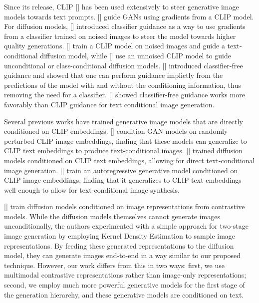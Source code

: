 Since its release, CLIP [] has been used extensively to steer generative image models towards text prompts. \citeauthor{clipglass,styleclip,bigsleep,stylegannada} [] guide GANs using gradients from a CLIP model. For diffusion models, \citeauthor{sotapaper} [] introduced classifier guidance as a way to use gradients from a classifier trained on noised images to steer the model towards higher quality generations. \citeauthor{glide} [] train a CLIP model on noised images and guide a text-conditional diffusion model, while \citeauthor{clipdiff,secondarymodelmethod} [] use an unnoised CLIP model to guide unconditional or class-conditional diffusion models. \citeauthor{uncond} [] introduced classifier-free guidance and showed that one can perform guidance implictly from the predictions of the model with and without the conditioning information, thus removing the need for a classifier. \citeauthor{glide} [] showed classifier-free guidance works more favorably than CLIP guidance for text conditional image generation. 

Several previous works have trained generative image models that are directly conditioned on CLIP embeddings. \citeauthor{lafite} [] condition GAN models on randomly perturbed CLIP image embeddings, finding that these models can generalize to CLIP text embeddings to produce text-conditional images. \citeauthor{vdiffusion} [] trained diffusion models conditioned on CLIP text embeddings, allowing for direct text-conditional image generation. \citeauthor{clipgen} [] train an autoregressive generative model conditioned on CLIP image embeddings, finding that it generalizes to CLIP text embeddings well enough to allow for text-conditional image synthesis.

\citeauthor{invertingssl} [] train diffusion models conditioned on image representations from contrastive models. While the diffusion models themselves cannot generate images unconditionally, the authors experimented with a simple approach for two-stage image generation by employing Kernel Density Estimation to sample image representations. By feeding these generated representations to the diffusion model, they can generate images end-to-end in a way similar to our proposed technique. However, our work differs from this in two ways: first, we use multimodal contrastive representations rather than image-only representations; second, we employ much more powerful generative models for the first stage of the generation hierarchy, and these generative models are conditioned on text.

